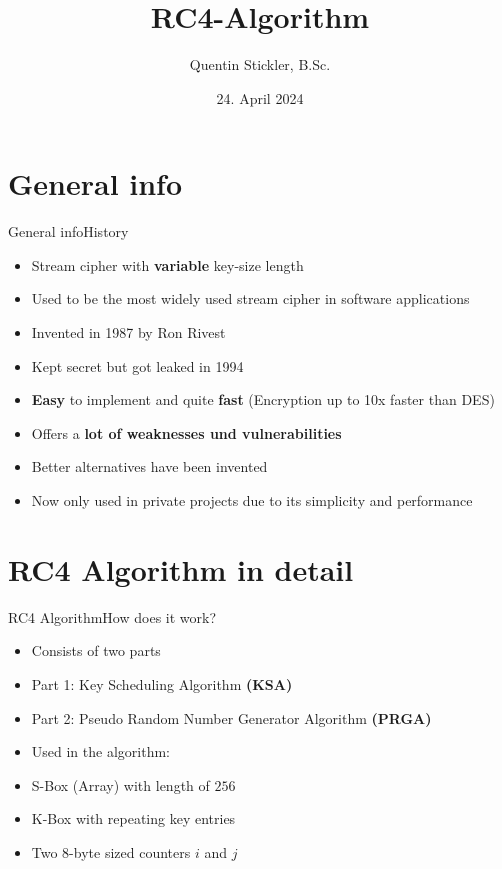 \documentclass[
	aspectratio=169,	%
	onlytextwidth,		%
	t,					%
	]{beamer}
\title[RC4-Algorithm]{RC4-Algorithm}
\author[Quentin Stickler]{Quentin Stickler, B.Sc.}
\date{24. April 2024} %
\begin{document}
\section{General info}

\begin{frame}[fragile]{General info}{History}
	\begin{itemize}
		\item Stream cipher with \textbf{variable} key-size length
		\item Used to be the most widely used stream cipher in software applications
		\item Invented in 1987 by Ron Rivest
		\item Kept secret but got leaked in 1994
		\item \textbf{Easy} to implement and quite \textbf{fast} (Encryption up to 10x faster than DES)
		\item Offers a \textbf{lot of weaknesses und vulnerabilities}
		\item Better alternatives have been invented
		\item Now only used in private projects due to its simplicity and performance
	\end{itemize}
\end{frame}

\section{RC4 Algorithm in detail}

\begin{frame}[fragile]{RC4 Algorithm}{How does it work?}
	\begin{itemize}
		\item Consists of two parts
		\item Part 1: Key Scheduling Algorithm \textbf{(KSA)}
		\item Part 2: Pseudo Random Number Generator Algorithm \textbf{(PRGA)}
		\item Used in the algorithm:
		\item S-Box (Array) with length of $256$
		\item K-Box with repeating key entries
		\item Two 8-byte sized counters $i$ and $j$
	\end{itemize}
\end{frame}
\end{document}
